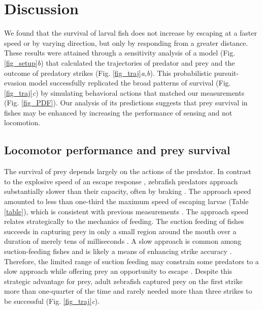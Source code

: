 \documentclass[]{rsos}%
\begin{document}
\pagebreak

\section{Discussion}%

We found that the survival of larval fish does not increase by escaping at a faster speed or by varying direction, but only by responding from a greater distance.
These results were attained through a sensitivity analysis of a model (Fig. \ref{fig_setup}\textit{b}) that calculated the trajectories of predator and prey and the outcome of predatory strikes (Fig. \ref{fig_traj}\textit{a,b}). 
This probabilistic pursuit-evasion model successfully replicated the broad patterns of survival (Fig. \ref{fig_traj}\textit{c}) by simulating behavioral actions that matched our measurements (Fig. \ref{fig_PDF}).
Our analysis of its predictions suggests that prey survival in fishes may be enhanced by increasing the performance of sensing and not locomotion.

\subsection{Locomotor performance and prey survival} 

The survival of prey depends largely on the actions of the predator.
In contrast to the explosive speed of an escape response \cite{Muller:2004hp}, zebrafish predators approach substantially slower than their capacity, often by braking \cite{McHenry:2005tc}.
The approach speed amounted to less than one-third the maximum speed of escaping larvae (Table \ref{table}), which is consistent with previous measurements \cite{Stewart:2013bha}.
The approach speed relates strategically to the mechanics of feeding.
The suction feeding of fishes succeeds in capturing prey in only a small region around the mouth over a duration of merely tens of milliseconds \cite{FerryGraham:2003bz,Higham:2005kg,Holzman:2007p15907}.
A slow approach is common among suction-feeding fishes and is likely a means of enhancing strike accuracy \cite{Webb:1984jz,Higham:2007go}.
Therefore, the limited range of suction feeding may constrain some predators to a slow approach while offering prey an opportunity to escape \cite{Holzman:2009uu}.
Despite this strategic advantage for prey, adult zebrafish captured prey on the first strike more than one-quarter of the time and rarely needed more than three strikes to be successful (Fig. \ref{fig_traj}\textit{c}).
\end{document}
